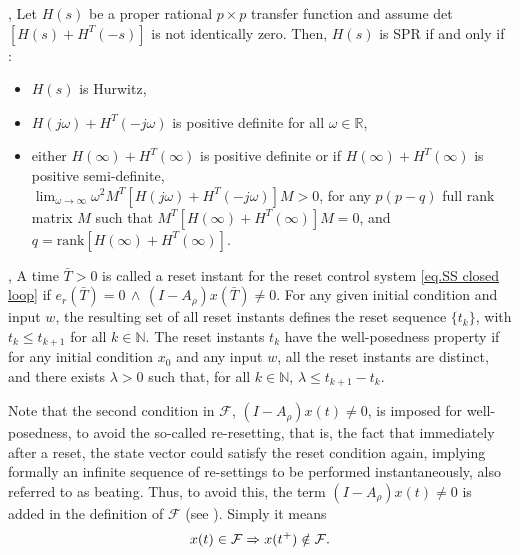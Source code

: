 
\begin{lemma}
\cite[Lemma 6.1]{khalil2002nonlinear}, Let $H(s)$ be a proper rational $p\times p$ transfer function and assume det$[H(s) + H^{T}(-s)]$ is not identically zero. Then, $H(s)$ is SPR if and only if :
\begin{itemize}
    \item $H(s)$ is Hurwitz,
    \item $H(j\omega) + H^{T}(-j\omega)$ is positive definite for all $\omega \in \mathbb{R}$,
    \item either $H(\infty) + H^{T}(\infty)$ is positive definite or
     if $H(\infty) + H^{T}(\infty)$ is positive semi-definite, \\ $\lim_{\omega \to \infty} \omega^2 M^{T}[H(j\omega) + H^{T}(-j\omega)]M>0$, for any $p (p - q)$ full rank matrix $M$ such that $M^{T}[H(\infty) + H^{T}(\infty)]M=0$, and $q = \text{rank}[H(\infty) + H^{T}(\infty)]$.\\
\end{itemize}
\label{lem: SPR}
\end{lemma}

\begin{definition}
    \label{well posedness}
\cite{dastjerdi2023frequency}, A time $\bar{T} > 0$ is called a reset instant for the reset control system \eqref{eq.SS closed loop} if $e_r(\bar{T})=0\,\wedge\,(I-A_\rho)x(\bar{T})\neq0$. For any given initial condition and input $w$, the resulting set of all reset instants defines the reset sequence $\{t_k\}$, with $t_k \leq t_{k+1}$ for all $k \in \mathbb{N}$. The reset instants $t_k$ have the well-posedness property if for any initial condition $x_0$ and any input $w$, all the reset instants are distinct, and there exists $\lambda > 0$ such that, for all $k \in \mathbb{N}$, $\lambda \leq t_{k+1} - t_k$.\\
\end{definition}
Note that the second condition in $\mathcal{F}$, $(I- A_\rho)x(t)\neq0$, is imposed for well-posedness, to avoid the so-called re-resetting, that is, the fact that immediately after a reset, the state vector could satisfy the reset condition again, implying formally an infinite sequence of re-settings to be performed
instantaneously, also referred to as beating. Thus, to avoid this, the term $(I- A_\rho)x(t)\neq0$ is added in the definition of $\mathcal{F}$ (see \cite[Section 1.4.1]{banos2012reset}). Simply it means
\begin{equation}
    \nonumber
    x(t)\in \mathcal{F} \Rightarrow  x(t^{+})\notin \mathcal{F}.\\
\end{equation}

